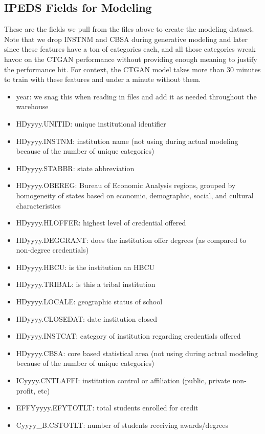 \documentclass[sigconf, authorversion, nonacm]{acmart}
\begin{document}
    \subsection{IPEDS Fields for Modeling}
        These are the fields we pull from the files above to create the modeling dataset. Note that we drop INSTNM and CBSA during generative modeling and later since these features have a ton of categories each, and all those categories wreak havoc on the CTGAN performance without providing enough meaning to justify the performance hit. For context, the CTGAN model takes more than 30 minutes to train with these features and under a minute without them.

        \begin{itemize}
            \item year: we snag this when reading in files and add it as needed throughout the warehouse
            \item HDyyyy.UNITID: unique institutional identifier
            \item HDyyyy.INSTNM: institution name (not using during actual modeling because of the number of unique categories)
            \item HDyyyy.STABBR: state abbreviation
            \item HDyyyy.OBEREG: Bureau of Economic Analysis regions, grouped by homogeneity of states based on economic, demographic, social, and cultural characteristics
            \item HDyyyy.HLOFFER: highest level of credential offered
            \item HDyyyy.DEGGRANT: does the institution offer degrees (as compared to non-degree credentials)
            \item HDyyyy.HBCU: is the institution an HBCU
            \item HDyyyy.TRIBAL: is this a tribal institution
            \item HDyyyy.LOCALE: geographic status of school
            \item HDyyyy.CLOSEDAT: date institution closed
            \item HDyyyy.INSTCAT: category of institution regarding credentials offered
            \item HDyyyy.CBSA: core based statistical area (not using during actual modeling because of the number of unique categories)
            \item ICyyyy.CNTLAFFI: institution control or affiliation (public, private non-profit, etc)
            \item EFFYyyyy.EFYTOTLT: total students enrolled for credit
            \item Cyyyy\_B.CSTOTLT: number of students receiving awards/degrees
        \end{itemize}
\end{document}
